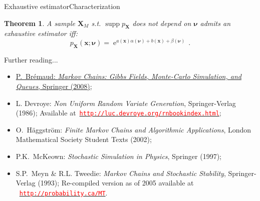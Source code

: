 \documentclass{beamer}
\newcommand{\iexp}{\operatorname{e}}
\newcommand{\xgj}{x}
\newcommand{\xg}{{\boldsymbol\xgj}}
\newcommand{\Xgj}{X}
\newcommand{\Xg}{{\boldsymbol\Xgj}}
\newcommand{\paraj}{\nu}
\newcommand{\parag}{{\boldsymbol\paraj}}
\newtheorem{mythe}{Theorem}
\begin{document}
\begin{frame}{Exhaustive estimator}{Characterization}

\begin{mythe}
A sample $\Xg_M$ s.t. $\operatorname{supp}p_\Xg$ does not depend on $\parag$ admits an exhaustive estimator iff:
\begin{displaymath}
p_\Xg(\xg;\parag)=\iexp^{a(\xg)\alpha(\parag)+b(\xg)+\beta(\parag)}\,.
\end{displaymath}
\end{mythe}

\end{frame}

\begin{frame}{Further reading...}
\footnotesize{
\begin{itemize}
\item \href{\webDOI/10.1007/978-1-4757-3124-8}{P.~Br\'emaud: \emph{Markov Chains: Gibbs Fields, Monte-Carlo Simulation, and Queues}, Springer (2008)};
\item L. Devroye: \emph{Non Uniform Random Variate Generation}, Springer-Verlag (1986); Available at~\href{http://luc.devroye.org/rnbookindex.html}{\textcolor{red}{\texttt{http://luc.devroye.org/rnbookindex.html}}};%
\item O.~H\"{a}ggstr\"{o}m: \emph{Finite Markov Chains and Algorithmic Applications}, London Mathematical Society Student Texts (2002);
\item P.K.~McKeown: \emph{Stochastic Simulation in Physics}, Springer (1997); 
\item S.P.~Meyn \& R.L. Tweedie: \emph{Markov Chains and Stochastic Stability}, Springer-Verlag (1993); Re-compiled version as of 2005 available at ~\href{http://probability.ca/MT}{\textcolor{red}{\texttt{http://probability.ca/MT}}}.%
\end{itemize}}

\end{frame}
\end{document}
